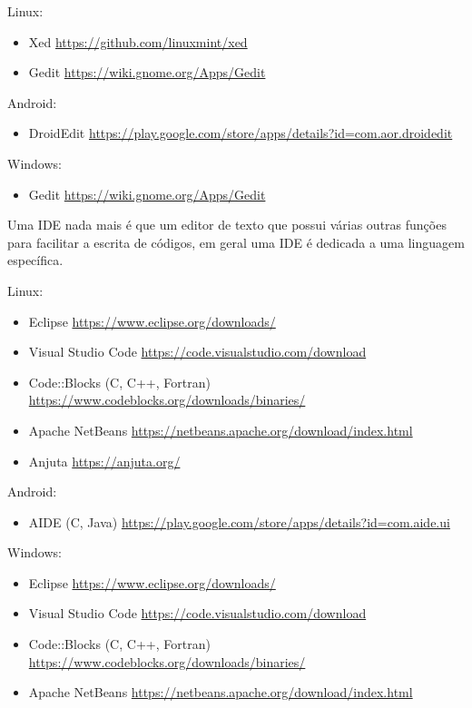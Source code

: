 Linux:
\begin{itemize}[nosep]
\item Xed \url{https://github.com/linuxmint/xed}
\item Gedit \url{https://wiki.gnome.org/Apps/Gedit}
\end{itemize}

Android:
\begin{itemize}[nosep]
\item DroidEdit \url{https://play.google.com/store/apps/details?id=com.aor.droidedit}
\end{itemize}

Windows:
\begin{itemize}[nosep]
\item Gedit \url{https://wiki.gnome.org/Apps/Gedit}
\end{itemize}

Uma IDE nada mais é que um editor de texto que possui várias outras funções
para facilitar a escrita de códigos, em geral uma IDE é dedicada a uma
linguagem específica.

Linux:
\begin{itemize}[nosep]
\item Eclipse \url{https://www.eclipse.org/downloads/}
\item Visual Studio Code \url{https://code.visualstudio.com/download}
\item Code::Blocks (C, C++, Fortran) \url{https://www.codeblocks.org/downloads/binaries/}
\item Apache NetBeans \url{https://netbeans.apache.org/download/index.html}
\item Anjuta \url{https://anjuta.org/}
\end{itemize}

Android:
\begin{itemize}[nosep]
\item AIDE (C, Java) \url{https://play.google.com/store/apps/details?id=com.aide.ui}
\end{itemize}

Windows:
\begin{itemize}[nosep]
\item Eclipse \url{https://www.eclipse.org/downloads/}
\item Visual Studio Code \url{https://code.visualstudio.com/download}
\item Code::Blocks (C, C++, Fortran) \url{https://www.codeblocks.org/downloads/binaries/}
\item Apache NetBeans \url{https://netbeans.apache.org/download/index.html}
\end{itemize}

